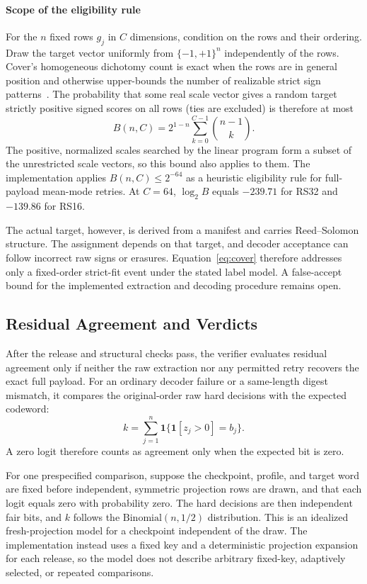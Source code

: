 \paragraph{Scope of the eligibility rule}
For the $n$ fixed rows $g_j$ in $C$ dimensions, condition on the rows and their ordering. Draw the target vector uniformly from $\{-1,+1\}^n$ independently of the rows. Cover's homogeneous dichotomy count is exact when the rows are in general position and otherwise upper-bounds the number of realizable strict sign patterns~\cite{cover1965geometrical}. The probability that some real scale vector gives a random target strictly positive signed scores on all rows (ties are excluded) is therefore at most
\begin{equation}
 B(n,C)=2^{1-n}\sum_{k=0}^{C-1}\binom{n-1}{k}.
 \label{eq:cover}
\end{equation}
The positive, normalized scales searched by the linear program form a subset of the unrestricted scale vectors, so this bound also applies to them. The implementation applies $B(n,C)\le2^{-64}$ as a heuristic eligibility rule for full-payload mean-mode retries.
At $C=64$, $\log_2 B$ equals $-239.71$ for RS32 and $-139.86$ for RS16.

The actual target, however, is derived from a manifest and carries Reed--Solomon structure. The assignment depends on that target, and decoder acceptance can follow incorrect raw signs or erasures. Equation~\eqref{eq:cover} therefore addresses only a fixed-order strict-fit event under the stated label model. A false-accept bound for the implemented extraction and decoding procedure remains open.

\subsection{Residual Agreement and Verdicts}
After the release and structural checks pass, the verifier evaluates residual agreement only if neither the raw extraction nor any permitted retry recovers the exact full payload. For an ordinary decoder failure or a same-length digest mismatch, it compares the original-order raw hard decisions with the expected codeword:
\begin{equation}
 k=\sum_{j=1}^{n}\mathbf{1}\{\mathbf{1}[z_j>0]=b_j\}.
 \label{eq:agreement}
\end{equation}
A zero logit therefore counts as agreement only when the expected bit is zero.

For one prespecified comparison, suppose the checkpoint, profile, and target word are fixed before independent, symmetric projection rows are drawn, and that each logit equals zero with probability zero. The hard decisions are then independent fair bits, and $k$ follows the $\mathrm{Binomial}(n,1/2)$ distribution. This is an idealized fresh-projection model for a checkpoint independent of the draw. The implementation instead uses a fixed key and a deterministic projection expansion for each release, so the model does not describe arbitrary fixed-key, adaptively selected, or repeated comparisons.

